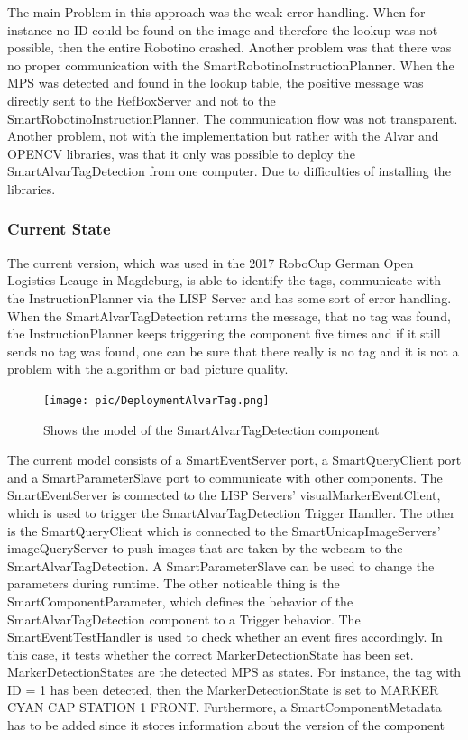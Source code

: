 The main Problem in this approach was the weak error handling. When for instance no ID could be found on the image and therefore the lookup was not possible, then the entire Robotino crashed. Another problem was that there was no proper communication with the SmartRobotinoInstructionPlanner. When the MPS was detected and found in the lookup table, the positive message was directly sent to the RefBoxServer and not to the SmartRobotinoInstructionPlanner. The communication flow was not transparent. Another problem, not with the implementation but rather with the Alvar and OPENCV libraries, was that it only was possible to deploy the SmartAlvarTagDetection from one computer. Due to difficulties of installing the libraries.



\subsubsection{Current State}

The current version, which was used in the 2017 RoboCup German Open Logistics Leauge in Magdeburg, is able to identify the tags, communicate with the InstructionPlanner via the LISP Server and has some sort of error handling. When the SmartAlvarTagDetection returns the message, that no tag was found, the InstructionPlanner keeps triggering the component five times and if it still sends no tag was found, one can be sure that there really is no tag and it is not a problem with the algorithm or bad picture quality. \\

\begin{figure}[h]
\centering
\texttt{[image: pic/DeploymentAlvarTag.png]}
\caption{Shows the model of the SmartAlvarTagDetection component}
\label{fig:smartAlvarFlow}
\end{figure}



The current model consists of a SmartEventServer port, a SmartQueryClient port and a SmartParameterSlave port to communicate with other components. The SmartEventServer is connected to the LISP Servers' visualMarkerEventClient, which is used to trigger the SmartAlvarTagDetection Trigger Handler. The other is the SmartQueryClient which is connected to the SmartUnicapImageServers' imageQueryServer to push images that are taken by the webcam to the SmartAlvarTagDetection. A SmartParameterSlave can be used to change the parameters during runtime. The other noticable thing is the SmartComponentParameter, which defines the behavior of the SmartAlvarTagDetection component to a Trigger behavior. The SmartEventTestHandler is used to check whether an event fires accordingly. In this case, it tests whether the correct MarkerDetectionState has been set. MarkerDetectionStates are the detected MPS as states. For instance, the tag with ID = 1 has been detected, then the MarkerDetectionState is set to MARKER CYAN CAP STATION 1 FRONT. Furthermore, a SmartComponentMetadata has to be added since it stores information about the version of the component\\

